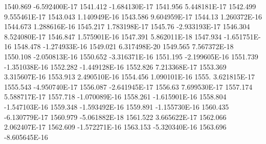 1540.869  -6.592400E-17
1541.412  -1.684130E-17
1541.956  5.448181E-17
1542.499  9.555461E-17
1543.043  1.140949E-16
1543.586  9.604959E-17
1544.13  1.260372E-16
1544.673  1.288616E-16
1545.217  1.783198E-17
1545.76  -2.933193E-17
1546.304  8.524080E-17
1546.847  1.575901E-16
1547.391  5.862011E-18
1547.934  -1.651751E-16
1548.478  -1.274933E-16
1549.021  6.317498E-20
1549.565  7.567372E-18
1550.108  -2.050813E-16
1550.652  -3.316371E-16
1551.195  -2.199605E-16
1551.739  -1.351038E-16
1552.282  -1.449128E-16
1552.826  7.213368E-17
1553.369  3.315607E-16
1553.913  2.490510E-16
1554.456  1.090101E-16
1555.  3.621815E-17
1555.543  -4.950740E-17
1556.087  -2.641945E-17
1556.63  7.699530E-17
1557.174  5.588717E-17
1557.718  -1.070089E-16
1558.261  -1.615901E-16
1558.804  -1.547103E-16
1559.348  -1.593492E-16
1559.891  -1.155730E-16
1560.435  -6.130779E-17
1560.979  -5.061882E-18
1561.522  3.665622E-17
1562.066  2.062407E-17
1562.609  -1.572271E-16
1563.153  -5.320340E-16
1563.696  -8.605645E-16
